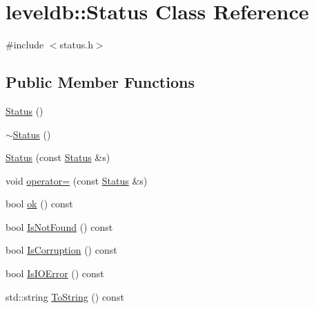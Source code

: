 \hypertarget{classleveldb_1_1_status}{\section{leveldb\-:\-:Status Class Reference}
\label{classleveldb_1_1_status}
}


{\ttfamily \#include $<$status.\-h$>$}

\subsection*{Public Member Functions}
\begin{DoxyCompactItemize}
\item 
\hyperlink{classleveldb_1_1_status_a941ec793179e81df3032a612cfe5039f}{Status} ()
\item 
\hyperlink{classleveldb_1_1_status_a5f36252202fb791ef8312fe848ffceb3}{$\sim$\-Status} ()
\item 
\hyperlink{classleveldb_1_1_status_a4fef11f480cb940d06c43e600076be13}{Status} (const \hyperlink{classleveldb_1_1_status}{Status} \&s)
\item 
void \hyperlink{classleveldb_1_1_status_a26a147ba1b39730335f5de14285b2c6a}{operator=} (const \hyperlink{classleveldb_1_1_status}{Status} \&s)
\item 
bool \hyperlink{classleveldb_1_1_status_ab31e89a858c766716e3dc952be857c65}{ok} () const 
\item 
bool \hyperlink{classleveldb_1_1_status_ad5462f26196fc04d72221d2fdf1872ca}{Is\-Not\-Found} () const 
\item 
bool \hyperlink{classleveldb_1_1_status_a0e07d12ab4f8d2a3e0b3c1bf435a77db}{Is\-Corruption} () const 
\item 
bool \hyperlink{classleveldb_1_1_status_af200f3aa95b7e455397baabf513673ec}{Is\-I\-O\-Error} () const 
\item 
std\-::string \hyperlink{classleveldb_1_1_status_aa8b56d8fe2cd1873778de5d1e5407866}{To\-String} () const 
\end{DoxyCompactItemize}
